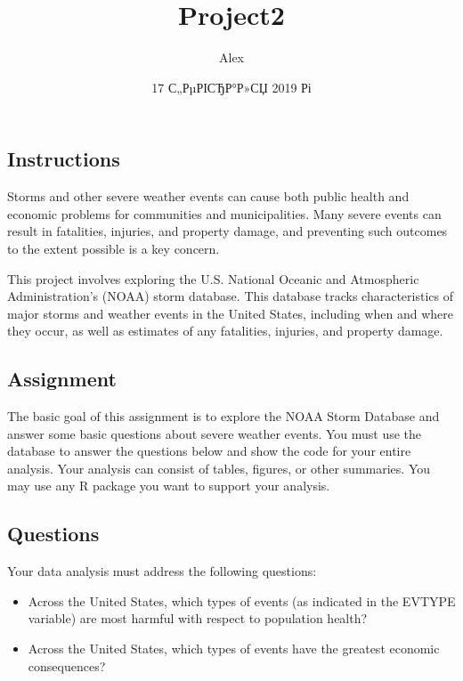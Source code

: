 \documentclass[]{article}
\title{Project2}
\author{Alex}
\date{17 С„РµРІСЂР°Р»СЏ 2019 Рі}
\providecommand{\tightlist}{%
  \setlength{\itemsep}{0pt}\setlength{\parskip}{0pt}}
\begin{document}
\maketitle

\subsection{Instructions}\label{instructions}

Storms and other severe weather events can cause both public health and
economic problems for communities and municipalities. Many severe events
can result in fatalities, injuries, and property damage, and preventing
such outcomes to the extent possible is a key concern.

This project involves exploring the U.S. National Oceanic and
Atmospheric Administration's (NOAA) storm database. This database tracks
characteristics of major storms and weather events in the United States,
including when and where they occur, as well as estimates of any
fatalities, injuries, and property damage.

\subsection{Assignment}\label{assignment}

The basic goal of this assignment is to explore the NOAA Storm Database
and answer some basic questions about severe weather events. You must
use the database to answer the questions below and show the code for
your entire analysis. Your analysis can consist of tables, figures, or
other summaries. You may use any R package you want to support your
analysis.

\subsection{Questions}\label{questions}

Your data analysis must address the following questions:

\begin{itemize}
\tightlist
\item
  Across the United States, which types of events (as indicated in the
  \color{red}{\verb|EVTYPE|}EVTYPE variable) are most harmful with
  respect to population health?
\item
  Across the United States, which types of events have the greatest
  economic consequences?
\end{itemize}
\end{document}
